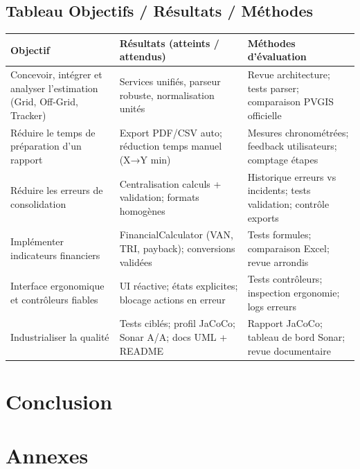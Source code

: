 \documentclass[11pt,a4paper]{report}
\begin{document}
\section{Tableau Objectifs / Résultats / Méthodes}
\begin{longtable}{p{} p{} p{}}
\toprule
\textbf{Objectif} & \textbf{Résultats (atteints / attendus)} & \textbf{Méthodes d'évaluation} \\
\midrule
Concevoir, intégrer et analyser l’estimation (Grid, Off-Grid, Tracker) & Services unifiés, parseur robuste, normalisation unités & Revue architecture; tests parser; comparaison PVGIS officielle \\
Réduire le temps de préparation d’un rapport & Export PDF/CSV auto; réduction temps manuel (X→Y min) & Mesures chronométrées; feedback utilisateurs; comptage étapes \\
Réduire les erreurs de consolidation & Centralisation calculs + validation; formats homogènes & Historique erreurs vs incidents; tests validation; contrôle exports \\
Implémenter indicateurs financiers & FinancialCalculator (VAN, TRI, payback); conversions validées & Tests formules; comparaison Excel; revue arrondis \\
Interface ergonomique et contrôleurs fiables & UI réactive; états explicites; blocage actions en erreur & Tests contrôleurs; inspection ergonomie; logs erreurs \\
Industrialiser la qualité & Tests ciblés; profil JaCoCo; Sonar A/A; docs UML + README & Rapport JaCoCo; tableau de bord Sonar; revue documentaire \\
\bottomrule
\end{longtable}

\chapter{Conclusion}

\appendix
\chapter{Annexes}
\end{document}
